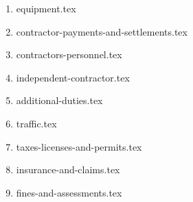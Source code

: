 \begin{enumerate}
    \item {equipment.tex}
    \item {contractor-payments-and-settlements.tex}
    \item {contractors-personnel.tex}
    \item {independent-contractor.tex}
    \item {additional-duties.tex}
    \item {traffic.tex}
    \item {taxes-licenses-and-permits.tex}
    \item {insurance-and-claims.tex}
    \item {fines-and-assessments.tex}
\end{enumerate}